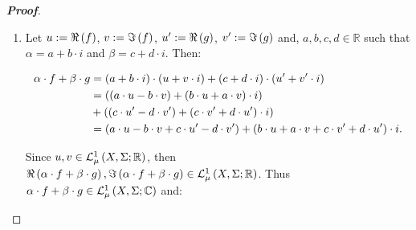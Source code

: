 \begin{proposition}
\begin{proof}[\rm\textbf{Proof}]
\begin{enumerate}
      \begin{equation}
        \int_{X}{f\,d\mu}=\int_{X}{\Re\pr{f}\,d\mu}-\int_{X}{\Im\pr{f}\,d\mu}\cdot i=\int_{N^c}{\Re\pr{f}\,d\mu}-\int_{N^c}{\Im\pr{f}\,d\mu}\cdot i=\int_{N^c}{f\,d\mu}.
      \end{equation}
      \item Let $u:=\Re\left(f\right)$, $v:=\Im\left(f\right)$, $u':=\Re\left(g\right)$, $v':=\Im\left(g\right)$ and, $a,b,c,d\in\mathbb{R}$ such that $\alpha=a+b\cdot i$ and $\beta=c+d\cdot i$. Then:
      
      \begin{equation}
        \begin{split}
          \alpha\cdot f+\beta\cdot g & =\left(a+b\cdot i\right)\cdot\left(u+v\cdot i\right)+\left(c+d\cdot i\right)\cdot\left(u'+v'\cdot i\right)\\
          & =\left(\left(a\cdot u-b\cdot v\right)+\left(b\cdot u+a\cdot v\right)\cdot i\right)\\
          & +\left(\left(c\cdot u'-d\cdot v'\right)+\left(c\cdot v'+d\cdot u'\right)\cdot i\right)\\
          & = \left(a\cdot u-b\cdot v+c\cdot u'-d\cdot v'\right)+\left(b\cdot u+a\cdot v+c\cdot v'+d\cdot u'\right)\cdot i.
        \end{split}
      \end{equation}

      Since $u,v\in\mathcal{L}^1_{\mu}\left(X,\Sigma;\mathbb{R}\right)$, then $\Re\left(\alpha\cdot f+\beta\cdot g\right),\Im\left(\alpha\cdot f+\beta\cdot g\right)\in\mathcal{L}^1_{\mu}\left(X,\Sigma;\mathbb{R}\right)$. Thus $\alpha\cdot f+\beta\cdot g\in\mathcal{L}^1_{\mu}\left(X,\Sigma;\mathbb{C}\right)$ and:


\end{enumerate}
\end{proof}
\end{proposition}
